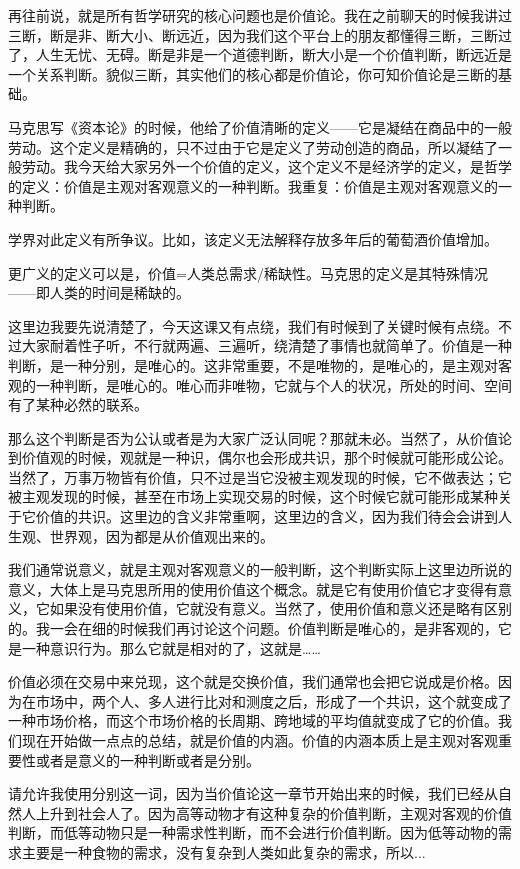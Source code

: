 \documentclass[UTF8, 12pt, a4paper]{ctexrep}
\begin{document}
再往前说，就是所有哲学研究的核心问题也是价值论。我在之前聊天的时候我讲过三断，断是非、断大小、断远近，因为我们这个平台上的朋友都懂得三断，三断过了，人生无忧、无碍。断是非是一个道德判断，断大小是一个价值判断，断远近是一个关系判断。貌似三断，其实他们的核心都是价值论，你可知价值论是三断的基础。

马克思写《资本论》的时候，他给了价值清晰的定义——它是凝结在商品中的一般劳动。这个定义是精确的，只不过由于它是定义了劳动创造的商品，所以凝结了一般劳动。我今天给大家另外一个价值的定义，这个定义不是经济学的定义，是哲学的定义：价值是主观对客观意义的一种判断。我重复：价值是主观对客观意义的一种判断。

{\kaishu 学界对此定义有所争议。比如，该定义无法解释存放多年后的葡萄酒价值增加。}

{\kaishu 更广义的定义可以是，价值=人类总需求/稀缺性。马克思的定义是其特殊情况——即人类的时间是稀缺的。}

这里边我要先说清楚了，今天这课又有点绕，我们有时候到了关键时候有点绕。不过大家耐着性子听，不行就两遍、三遍听，绕清楚了事情也就简单了。价值是一种判断，是一种分别，是唯心的。这非常重要，不是唯物的，是唯心的，是主观对客观的一种判断，是唯心的。唯心而非唯物，它就与个人的状况，所处的时间、空间有了某种必然的联系。

那么这个判断是否为公认或者是为大家广泛认同呢？那就未必。当然了，从价值论到价值观的时候，观就是一种识，偶尔也会形成共识，那个时候就可能形成公论。当然了，万事万物皆有价值，只不过是当它没被主观发现的时候，它不做表达；它被主观发现的时候，甚至在市场上实现交易的时候，这个时候它就可能形成某种关于它价值的共识。这里边的含义非常重啊，这里边的含义，因为我们待会会讲到人生观、世界观，因为都是从价值观出来的。

我们通常说意义，就是主观对客观意义的一般判断，这个判断实际上这里边所说的意义，大体上是马克思所用的使用价值这个概念。就是它有使用价值它才变得有意义，它如果没有使用价值，它就没有意义。当然了，使用价值和意义还是略有区别的。我一会在细的时候我们再讨论这个问题。价值判断是唯心的，是非客观的，它是一种意识行为。那么它就是相对的了，这就是……

价值必须在交易中来兑现，这个就是交换价值，我们通常也会把它说成是价格。因为在市场中，两个人、多人进行比对和测度之后，形成了一个共识，这个就变成了一种市场价格，而这个市场价格的长周期、跨地域的平均值就变成了它的价值。我们现在开始做一点点的总结，就是价值的内涵。价值的内涵本质上是主观对客观重要性或者是意义的一种判断或者是分别。

请允许我使用分别这一词，因为当价值论这一章节开始出来的时候，我们已经从自然人上升到社会人了。因为高等动物才有这种复杂的价值判断，主观对客观的价值判断，而低等动物只是一种需求性判断，而不会进行价值判断。因为低等动物的需求主要是一种食物的需求，没有复杂到人类如此复杂的需求，所以...
\end{document}
